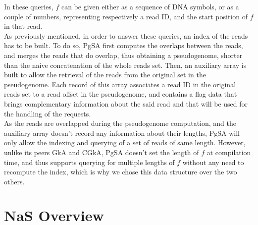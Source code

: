 \documentclass[twoside,twocolumn]{article}
\begin{document}
In these queries, $f$ can be given either as a sequence of DNA symbols, or as a couple of numbers, representing respectively a read ID, and the
start position of $f$ in that read. \\
\indent As previously mentioned, in order to answer these queries, an index of the reads has to be built. To do so, PgSA first computes the overlaps
between the reads, and merges the reads that do overlap, thus obtaining a pseudogenome, shorter than the naive concatenation of the whole reads set. 
Then, an auxiliary array is built to allow the retrieval of the reads from the original set in the pseudogenome. Each record of this array  
associates a read ID in the original reads set to a read offset in the pseudogenome, and contains a flag data that brings complementary information about
the said read and that will be used for the handling of the requests. \\
\indent As the reads are overlapped during the pseudogenome computation, and the auxiliary array doesn't record any information about their lengths, PgSA will only allow the indexing and querying of a set of reads of same length. However, unlike its peers GkA and CGkA, PgSA doesn't set 
the length of $f$ at compilation time, and thus supports querying for multiple lengths of $f$ without any need to recompute the index, which is why
we chose this data structure over the two others. 


\section{NaS Overview}
\end{document}
